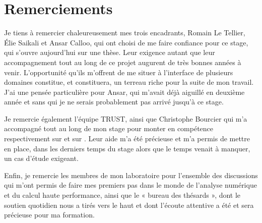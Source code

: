 





\section*{Remerciements}

Je tiens à remercier chaleureusement mes trois encadrants, Romain Le Tellier, Élie Saikali et Ansar Calloo, qui ont choisi de me faire confiance pour ce stage, qui s'ouvre aujourd'hui sur une thèse. Leur exigence autant que leur accompagnement tout au long de ce projet augurent de très bonnes années à venir. L'opportunité qu'ils m'offrent de me situer à l'interface de plusieurs domaines constitue, et constituera, un terreau riche pour la suite de mon travail. J'ai une pensée particulière pour Ansar, qui m'avait déjà aiguillé en deuxième année et sans qui je ne serais probablement pas arrivé jusqu'à ce stage.

Je remercie également l'équipe TRUST, ainsi que Christophe Bourcier qui m'a accompagné tout au long de mon stage pour monter en compétence respectivement sur \trust et sur \salome. Leur aide m'a été précieuse et m'a permis de mettre en place, dans les derniers temps du stage alors que le temps venait à manquer, un cas d'étude exigeant.

Enfin, je remercie les membres de mon laboratoire pour l'ensemble des discussions qui m'ont permis de faire mes premiers pas dans le monde de l'analyse numérique et du calcul haute performance, ainsi que le « bureau des thésards », dont le soutien quotidien nous a tirés vers le haut et dont l'écoute attentive a été et sera précieuse pour ma formation.


